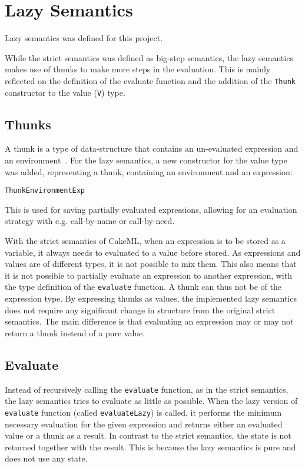\chapter{Lazy Semantics}
\label{LazySem}
Lazy semantics was defined for this project.

While the strict semantics was defined as big-step semantics, the lazy semantics
makes use of thunks to make more steps in the evaluation.
This is mainly reflected on the definition of the evaluate function
and the addition of the \texttt{Thunk} constructor to the value (\texttt{V})
type.

\section{Thunks}

A thunk is a type of data-structure that contains an un-evaluated expression
and an environment~\cite{Takano:2015:TRL:2695664.2695693}.
For the lazy semantics, a new constructor for the value type was added,
representing a thunk, containing an environment and an expression:
\begin{alltt}
Thunk Environment Exp
\end{alltt}
This is used for saving
partially evaluated expressions, allowing for an evaluation strategy with e.g.
call-by-name or call-by-need.

With the strict semantics of CakeML, when an expression is to be stored as a
variable, it always needs to evaluated to a value before stored.
As expressions and values are of different types, it is not possible to mix
them. This also means that it is not possible to partially evaluate an
expression to another expression, with the type definition of the
\texttt{evaluate} function. A thunk can thus not be of the expression type.
By expressing thunks as values, the implemented lazy semantics does not require
any significant change in structure from the original strict semantics. The main
difference is that evaluating an expression may or may not return a thunk
instead of a pure value.

\section{Evaluate}
\label{Eval}
Instead of recursively calling the \texttt{evaluate} function, as
in the strict semantics, the lazy semantics tries to evaluate as little as possible.
When the lazy version of \texttt{evaluate} function (called
\texttt{evaluateLazy}) is called, it performs the minimum necessary evaluation
for the given expression and returns either an evaluated value or a thunk as a result.
In contrast to the strict semantics, the state is not returned together with the
result. This is because the lazy semantics is pure and does not use any state.

